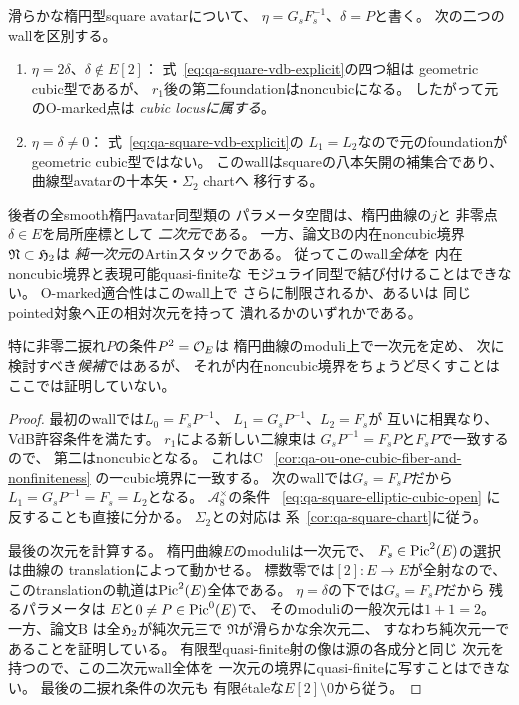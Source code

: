 \begin{proposition}
\label{prop:qa-avatar-walls-and-noncubic-dimension}
滑らかな楕円型square avatarについて、
$\eta=G_sF_s^{-1}$、$\delta=P$と書く。
次の二つのwallを区別する。
\begin{enumerate}
\item $\eta=2\delta$、$\delta\notin E[2]$：
式~\eqref{eq:qa-square-vdb-explicit}の四つ組は
geometric cubic型であるが、
$r_1$後の第二foundationはnoncubicになる。
したがって元のO-marked点は
\emph{cubic locusに属する}。
\item $\eta=\delta\ne0$：
式~\eqref{eq:qa-square-vdb-explicit}の
$L_1=L_2$なので元のfoundationが
geometric cubic型ではない。
このwallはsquareの八本矢開の補集合であり、
曲線型avatarの十本矢・$\Sigma_2$ chartへ
移行する。
\end{enumerate}
後者の全smooth楕円avatar同型類の
パラメータ空間は、楕円曲線の$j$と
非零点$\delta\in E$を局所座標として
\emph{二次元}である。
一方、論文Bの内在noncubic境界
$\mathfrak N\subset\mathfrak H_2$は
\emph{純一次元}のArtinスタックである。
従ってこのwall\emph{全体}を
内在noncubic境界と表現可能quasi-finiteな
モジュライ同型で結び付けることはできない。
O-marked適合性はこのwall上で
さらに制限されるか、あるいは
同じpointed対象へ正の相対次元を持って
潰れるかのいずれかである。

特に非零二捩れ$P$の条件$P^2=\mathcal O_E$は
楕円曲線のmoduli上で一次元を定め、
次に検討すべき\emph{候補}ではあるが、
それが内在noncubic境界をちょうど尽くすことは
ここでは証明していない。
\end{proposition}
\begin{proof}
最初のwallでは$L_0=F_sP^{-1}$、
$L_1=G_sP^{-1}$、$L_2=F_s$が
互いに相異なり、VdB許容条件を満たす。
$r_1$による新しい二線束は
$G_sP^{-1}=F_sP$と$F_sP$で一致するので、
第二はnoncubicとなる。
これはC
~\ref{cor:qa-ou-one-cubic-fiber-and-nonfiniteness}
の一cubic境界に一致する。
次のwallでは$G_s=F_sP$だから
$L_1=G_sP^{-1}=F_s=L_2$となる。
$\mathcal A_8^\times$の条件
~\eqref{eq:qa-square-elliptic-cubic-open}
に反することも直接に分かる。
$\Sigma_2$との対応は
系~\ref{cor:qa-square-chart}に従う。

最後の次元を計算する。
楕円曲線$E$のmoduliは一次元で、
$F_s\in\operatorname{Pic}^2(E)$の選択は曲線の
translationによって動かせる。
標数零では$[2]:E\to E$が全射なので、
このtranslationの軌道は$\operatorname{Pic}^2(E)$全体である。
$\eta=\delta$の下では$G_s=F_sP$だから
残るパラメータは
$E$と$0\ne P\in\operatorname{Pic}^0(E)$で、
そのmoduliの一般次元は$1+1=2$。
一方、論文B
\cite[\texttt{thm:noncubic-boundary-smooth-codim-two}]{QuadricModuli2026}
は全$\mathfrak H_2$が純次元三で
$\mathfrak N$が滑らかな余次元二、
すなわち純次元一であることを証明している。
有限型quasi-finite射の像は源の各成分と同じ
次元を持つので、この二次元wall全体を
一次元の境界にquasi-finiteに写すことはできない。
最後の二捩れ条件の次元も
有限étaleな$E[2]\setminus0$から従う。
\end{proof}

